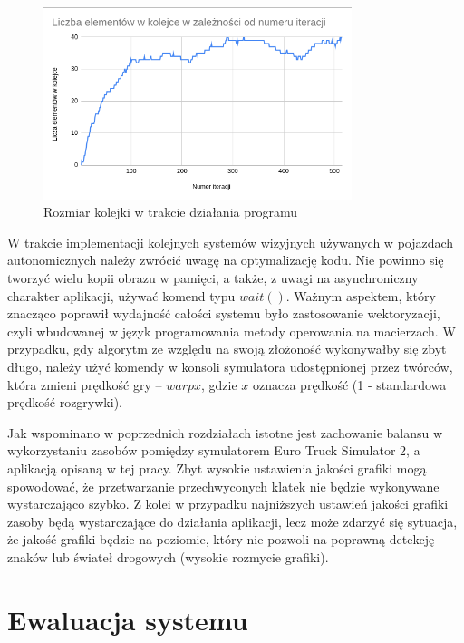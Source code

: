 \begin{figure}
  \centering
  \includegraphics[width=9cm]{img/queue_stats.png}
  \caption{Rozmiar kolejki w trakcie działania programu}
  \label{fig:queue_stats}
\end{figure}

W trakcie implementacji kolejnych systemów wizyjnych używanych w pojazdach autonomicznych należy zwrócić uwagę na optymalizację kodu. 
Nie powinno się tworzyć wielu kopii obrazu w pamięci, a także, z uwagi na asynchroniczny charakter aplikacji,  używać komend typu $wait()$. 
Ważnym aspektem, który znacząco poprawił wydajność całości systemu było zastosowanie wektoryzacji, czyli wbudowanej w język programowania metody operowania na macierzach. 
W przypadku, gdy algorytm ze względu na swoją złożoność wykonywałby się zbyt długo, należy użyć komendy w konsoli symulatora udostępnionej przez twórców, która zmieni prędkość gry -- $warp x$, gdzie $x$ oznacza prędkość (1 - standardowa prędkość rozgrywki).

Jak wspominano w poprzednich rozdziałach istotne jest zachowanie balansu w wykorzystaniu zasobów pomiędzy symulatorem Euro Truck Simulator 2, a aplikacją opisaną w tej pracy. Zbyt wysokie ustawienia jakości grafiki mogą spowodować, że przetwarzanie przechwyconych klatek nie będzie wykonywane wystarczająco szybko. Z kolei w przypadku najniższych ustawień jakości grafiki zasoby będą wystarczające do działania aplikacji, lecz może zdarzyć się sytuacja, że jakość grafiki będzie na poziomie, który nie pozwoli na poprawną detekcję znaków lub świateł drogowych (wysokie rozmycie grafiki).
\section{Ewaluacja systemu}

